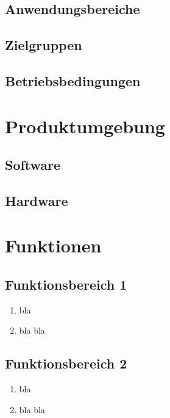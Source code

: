 \documentclass[parskip=full]{scrartcl}
\def\threedigits#1{%
  \ifnum#1<100 0\fi
  \ifnum#1<10 0\fi
  \number#1}
\begin{document}
\subsection{Anwendungsbereiche}
\subsection{Zielgruppen}
\subsection{Betriebsbedingungen}


\section{Produktumgebung}

\subsection{Software}
\subsection{Hardware}


\section{Funktionen}

\subsection{Funktionsbereich 1}

\begin{enumerate}[label={\textbf{/F\protect\threedigits{\theenumi}0/}}, leftmargin=*]
	\item bla
	\item bla bla
\end{enumerate}
\subsection{Funktionsbereich 2}

\begin{enumerate}[label={\textbf{/F\protect\threedigits{\theenumi}0/}}, leftmargin=*, resume]
	\item bla
	\item bla bla
\end{enumerate}
\end{document}
